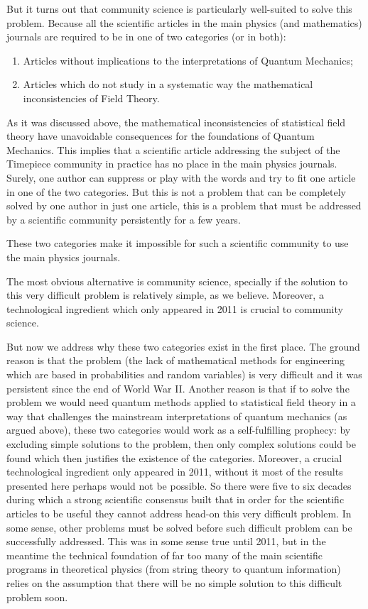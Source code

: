 \documentclass[11pt]{book}
\begin{document}
But it turns out that community science is particularly well-suited to
solve this problem. Because all the scientific articles in the main
physics (and mathematics) journals are required to be in one of two
categories (or in both):

\begin{enumerate}
\item
  Articles without implications to the interpretations of Quantum
  Mechanics;
\item
  Articles which do not study in a systematic way the mathematical
  inconsistencies of Field Theory.
\end{enumerate}

As it was discussed above, the mathematical inconsistencies of
statistical field theory have unavoidable consequences for the
foundations of Quantum Mechanics. This implies that a scientific article
addressing the subject of the Timepiece community in practice has no
place in the main physics journals. Surely, one author can suppress or
play with the words and try to fit one article in one of the two
categories. But this is not a problem that can be completely solved by
one author in just one article, this is a problem that must be addressed
by a scientific community persistently for a few years.

These two categories make it impossible for such a scientific community
to use the main physics journals.

The most obvious alternative is community science, specially if the
solution to this very difficult problem is relatively simple, as we
believe. Moreover, a technological ingredient which only appeared in
2011\cite{doi:10.1126ux2fscience.352.6285.508}
is crucial to community science.

But now we address why these two categories exist in the first place.
The ground reason is that the problem (the lack of mathematical methods
for engineering which are based in probabilities and random variables)
is very difficult and it was persistent since the end of World War II.
Another reason is that if to solve the problem we would need quantum
methods applied to statistical field theory in a way that challenges the
mainstream interpretations of quantum mechanics (as argued above), these
two categories would work as a self-fulfilling prophecy: by excluding
simple solutions to the problem, then only complex solutions could be
found which then justifies the existence of the categories. Moreover, a
crucial technological ingredient only appeared in
2011\cite{doi:10.1126ux2fscience.352.6285.508},
without it most of the results presented here perhaps would not be
possible. So there were five to six decades during which a strong
scientific consensus built that in order for the scientific articles to
be useful they cannot address head-on this very difficult problem. In
some sense, other problems must be solved before such difficult problem
can be successfully addressed. This was in some sense true until
2011\cite{doi:10.1126ux2fscience.352.6285.508},
but in the meantime the technical foundation of far too many of the main
scientific programs in theoretical physics (from string theory to
quantum information) relies on the assumption that there will be no
simple solution to this difficult problem soon.
\end{document}

